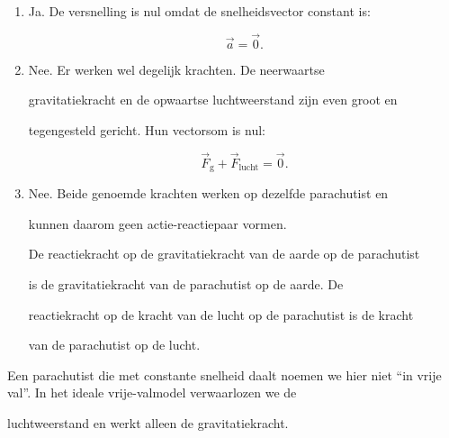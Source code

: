 \documentclass{ximera}
\begin{document}
\begin{oefening}[De parachutist]{\oefU\ESS}
\begin{oplossing}
\begin{enumerate}
  \item Ja. De versnelling is nul omdat de snelheidsvector constant is:

  \[\boxed{\vec a=\vec0}.\]

  \item Nee. Er werken wel degelijk krachten. De neerwaartse

  gravitatiekracht en de opwaartse luchtweerstand zijn even groot en

  tegengesteld gericht. Hun vectorsom is nul:

  \[\boxed{ \vec F_{\mathrm g}+\vec F_{\mathrm{lucht}}=\vec0 }.\]

  \item Nee. Beide genoemde krachten werken op dezelfde parachutist en

  kunnen daarom geen actie-reactiepaar vormen.

  De reactiekracht op de gravitatiekracht van de aarde op de parachutist

  is de gravitatiekracht van de parachutist op de aarde. De

  reactiekracht op de kracht van de lucht op de parachutist is de kracht

  van de parachutist op de lucht.

\end{enumerate}

\end{oplossing}

\end{oefening}


\begin{opmerking}

Een parachutist die met constante snelheid daalt noemen we hier niet ``in vrije val''. In het ideale vrije-valmodel verwaarlozen we de

luchtweerstand en werkt alleen de gravitatiekracht.

\end{opmerking}




\end{document}
